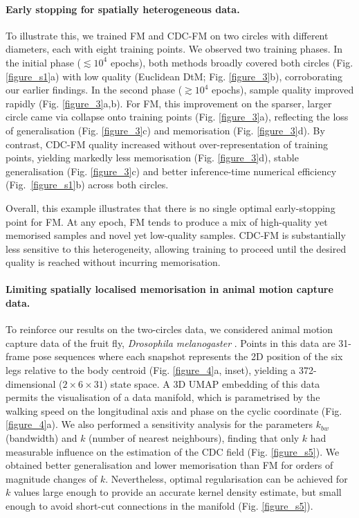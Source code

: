 \documentclass{article} %
\begin{document}
\paragraph{Early stopping for spatially heterogeneous data.} 
To illustrate this, we trained FM and CDC-FM on two circles with different diameters, each with eight training points.
We observed two training phases.
In the initial phase ($\lesssim$$10^4$ epochs), both methods broadly covered both circles (Fig. \ref{figure_s1}a) with low quality (Euclidean DtM; Fig. \ref{figure_3}b), corroborating our earlier findings.
In the second phase ($\gtrsim$$10^4$ epochs), sample quality improved rapidly (Fig. \ref{figure_3}a,b). 
For FM, this improvement on the sparser, larger circle came via collapse onto training points (Fig. \ref{figure_3}a), reflecting the loss of generalisation (Fig. \ref{figure_3}c) and memorisation (Fig. \ref{figure_3}d).  
By contrast, CDC-FM quality increased without over-representation of training points, yielding markedly less memorisation (Fig. \ref{figure_3}d), stable generalisation (Fig. \ref{figure_3}c) and better inference-time numerical efficiency (Fig.~\ref{figure_s1}b) across both circles.

Overall, this example illustrates that there is no single optimal early-stopping point for FM. At any epoch, FM tends to produce a mix of high-quality yet memorised samples and novel yet low-quality samples. 
CDC‑FM is substantially less sensitive to this heterogeneity, allowing training to proceed until the desired quality is reached without incurring memorisation.


\paragraph{Limiting spatially localised memorisation in animal motion capture data.}
To reinforce our results on the two-circles data, we considered animal motion capture data of the fruit fly, \textit{Drosophila melanogaster} \citep{deangelis}. 
Points in this data are 31-frame pose sequences where each snapshot represents the 2D position of the six legs relative to the body centroid  (Fig. \ref{figure_4}a, inset), yielding a 372-dimensional ($2\times 6 \times 31$) state space. 
A 3D UMAP embedding of this data permits the visualisation of a data manifold, which is parametrised by the walking speed on the longitudinal axis and phase on the cyclic coordinate (Fig. \ref{figure_4}a). 
We also performed a sensitivity analysis for the parameters $k_{bw}$ (bandwidth) and $k$ (number of nearest neighbours), finding that only $k$ had measurable influence on the estimation of the CDC field (Fig. \ref{figure_s5}). We obtained better generalisation and lower memorisation than FM for orders of magnitude changes of $k$. Nevertheless, optimal regularisation can be achieved for $k$ values large enough to provide an accurate kernel density estimate, but small enough to avoid short-cut connections in the manifold (Fig. \ref{figure_s5}).
\end{document}
